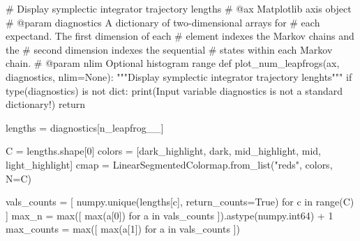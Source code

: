 \documentclass[
  letterpaper,
  DIV=11,
  numbers=noendperiod]{scrartcl}
\newenvironment{Shaded}{\begin{snugshade}}{\end{snugshade}}
\newcommand{\BuiltInTok}[1]{\textcolor[rgb]{0.00,0.23,0.31}{#1}}
\newcommand{\CommentTok}[1]{\textcolor[rgb]{0.37,0.37,0.37}{#1}}
\newcommand{\ControlFlowTok}[1]{\textcolor[rgb]{0.00,0.23,0.31}{#1}}
\newcommand{\DecValTok}[1]{\textcolor[rgb]{0.68,0.00,0.00}{#1}}
\newcommand{\KeywordTok}[1]{\textcolor[rgb]{0.00,0.23,0.31}{#1}}
\newcommand{\NormalTok}[1]{\textcolor[rgb]{0.00,0.23,0.31}{#1}}
\newcommand{\OperatorTok}[1]{\textcolor[rgb]{0.37,0.37,0.37}{#1}}
\newcommand{\StringTok}[1]{\textcolor[rgb]{0.13,0.47,0.30}{#1}}
\newcommand{\VariableTok}[1]{\textcolor[rgb]{0.07,0.07,0.07}{#1}}
\begin{document}
\begin{Shaded}
\begin{Highlighting}[]

\CommentTok{\# Display symplectic integrator trajectory lengths}
\CommentTok{\# @ax Matplotlib axis object}
\CommentTok{\# @param diagnostics A dictionary of two{-}dimensional arrays for }
\CommentTok{\#                    each expectand.  The first dimension of each}
\CommentTok{\#                    element indexes the Markov chains and the }
\CommentTok{\#                    second dimension indexes the sequential }
\CommentTok{\#                    states within each Markov chain.}
\CommentTok{\# @param nlim Optional histogram range}
\KeywordTok{def}\NormalTok{ plot\_num\_leapfrogs(ax, diagnostics, nlim}\OperatorTok{=}\VariableTok{None}\NormalTok{):}
  \CommentTok{"""Display symplectic integrator trajectory lenghts"""}
  \ControlFlowTok{if} \BuiltInTok{type}\NormalTok{(diagnostics) }\KeywordTok{is} \KeywordTok{not} \BuiltInTok{dict}\NormalTok{:}
    \BuiltInTok{print}\NormalTok{(}\StringTok{\textquotesingle{}Input variable \textasciigrave{}diagnostics\textasciigrave{} is not a standard dictionary!\textquotesingle{}}\NormalTok{)}
    \ControlFlowTok{return}
  
\NormalTok{  lengths }\OperatorTok{=}\NormalTok{ diagnostics[}\StringTok{\textquotesingle{}n\_leapfrog\_\_\textquotesingle{}}\NormalTok{]}
  
\NormalTok{  C }\OperatorTok{=}\NormalTok{ lengths.shape[}\DecValTok{0}\NormalTok{]}
\NormalTok{  colors }\OperatorTok{=}\NormalTok{ [dark\_highlight, dark, mid\_highlight, mid, light\_highlight]}
\NormalTok{  cmap }\OperatorTok{=}\NormalTok{ LinearSegmentedColormap.from\_list(}\StringTok{"reds"}\NormalTok{, colors, N}\OperatorTok{=}\NormalTok{C)}
  
\NormalTok{  vals\_counts }\OperatorTok{=}\NormalTok{ [ numpy.unique(lengths[c], return\_counts}\OperatorTok{=}\VariableTok{True}\NormalTok{) }
                  \ControlFlowTok{for}\NormalTok{ c }\KeywordTok{in} \BuiltInTok{range}\NormalTok{(C) ] }
\NormalTok{  max\_n }\OperatorTok{=} \BuiltInTok{max}\NormalTok{([ }\BuiltInTok{max}\NormalTok{(a[}\DecValTok{0}\NormalTok{]) }\ControlFlowTok{for}\NormalTok{ a }\KeywordTok{in}\NormalTok{ vals\_counts ]).astype(numpy.int64) }\OperatorTok{+} \DecValTok{1}
\NormalTok{  max\_counts }\OperatorTok{=} \BuiltInTok{max}\NormalTok{([ }\BuiltInTok{max}\NormalTok{(a[}\DecValTok{1}\NormalTok{]) }\ControlFlowTok{for}\NormalTok{ a }\KeywordTok{in}\NormalTok{ vals\_counts ])}
  

\end{Highlighting}
\end{Shaded}
\end{document}
